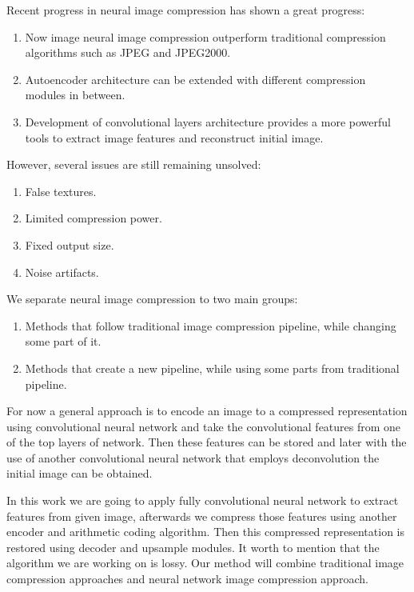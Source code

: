 Recent progress in neural image compression has shown a great progress:

\begin{enumerate}
    \item Now image neural image compression outperform traditional compression algorithms such as JPEG and JPEG2000.
    \item Autoencoder architecture can be extended with different compression modules in between.
    \item Development of convolutional layers architecture provides a more powerful tools to extract image features and reconstruct initial image.
\end{enumerate}

However, several issues are still remaining unsolved:

\begin{enumerate}
    \item False textures.
    \item Limited compression power.
    \item Fixed output size.
    \item Noise artifacts.
\end{enumerate}

We separate neural image compression to two main groups:

\begin{enumerate}
    \item Methods that follow traditional image compression pipeline, while changing some part of it.
    \item Methods that create a new pipeline, while using some parts from traditional pipeline.
\end{enumerate}

For now a general approach is to encode an image to a compressed representation using convolutional neural network and take the convolutional features from one of the top layers of network. Then these features can be stored and later with the use of another convolutional neural network that employs deconvolution the initial image can be obtained.

In this work we are going to apply fully convolutional neural network to extract features from given image, afterwards we compress those features using another encoder and arithmetic coding algorithm. Then this compressed representation is restored using decoder and upsample modules. It worth to mention that the algorithm we are working on is lossy. Our method will combine traditional image compression approaches and neural network image compression approach.

